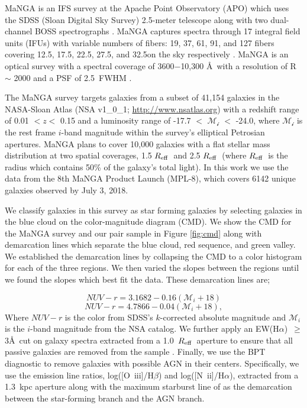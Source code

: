 \documentclass[iop,revtex4,twocolumn,apj,numberedappendix,appendixfloats]{emulateapj}
\newcommand{\reff}{$R_{\rm eff}$}
\newcommand{\ewha}{EW(H$\alpha$)}
\begin{document}
MaNGA is an IFS survey at the Apache Point Observatory (APO) which uses the SDSS (Sloan Digital Sky Survey) 2.5-meter telescope along with two dual-channel BOSS spectrographs \citep{Drory:2015}. MaNGA captures spectra through 17 integral field units (IFUs) with variable numbers of fibers: 19, 37, 61, 91, and 127 fibers covering 12.5\arcsec, 17.5\arcsec, 22.5\arcsec, 27.5\arcsec, and 32.5\arcsec on the sky respectively \citep{Law:2015}. MaNGA is an optical survey with a spectral coverage of 3600$-$10,300 \AA\ with a resolution of R $\sim$ 2000 and a PSF of 2.5\arcsec\ FWHM \citep{Bundy:2015}. 

The MaNGA survey targets galaxies from a subset of 41,154 galaxies in the NASA-Sloan Atlas (NSA v1\_0\_1; \url{http://www.nsatlas.org}) with a redshift range of 0.01 $< z <$ 0.15 and a luminosity range of -17.7 $<$ $\mathcal{M_i}$ $<$ -24.0, where $\mathcal{M_i}$ is the rest frame $i$-band magnitude within the survey's elliptical Petrosian apertures. MaNGA plans to cover 10,000 galaxies with a flat stellar mass distribution at two spatial coverages, 1.5 \reff\ and 2.5 \reff\ (where \reff\ is the radius which contains 50\% of the galaxy's total light). In this work we use the data from the 8th MaNGA Product Launch (MPL-8), which covers 6142 unique galaxies observed by July 3, 2018. 

We classify galaxies in this survey as star forming galaxies by selecting galaxies in the blue cloud on the color-magnitude diagram (CMD). We show the CMD for the MaNGA survey and our pair sample in Figure \ref{fig:cmd} along with demarcation lines which separate the blue cloud, red sequence, and green valley. We established the demarcation lines by collapsing the CMD to a color histogram for each of the three regions. We then varied the slopes between the regions until we found the slopes which best fit the data. These demarcation lines are;

\begin{equation}\label{eq:blue}
NUV-r = 3.1682 - 0.16 (\mathcal{M}_i+18)
\end{equation}
\begin{equation}\label{eq:red}
NUV-r = 4.7866 - 0.04 (\mathcal{M}_i+18),
\end{equation}
Where $NUV-r$ is the color from SDSS's $k$-corrected absolute magnitude and $\mathcal{M}_i$ is the $i$-band magnitude from the NSA catalog. We further apply an \ewha\ $\ge$ 3\AA\ cut on galaxy spectra extracted from a 1.0~\reff\ aperture to ensure that all passive galaxies are removed from the sample \citep{Cid-Fernandes:2011}. Finally, we use the BPT diagnostic \citep{Baldwin:1981} to remove galaxies with possible AGN in their centers. Specifically, we use the emission line ratios, log([O~{\sc iii}]/H$\beta$) and log([N~{\sc ii}]/H$\alpha$), extracted from a 1.3~kpc aperture along with the maximum starburst line of \citet{Kewley:2001} as the demarcation between the star-forming branch and the AGN branch.
\end{document}
